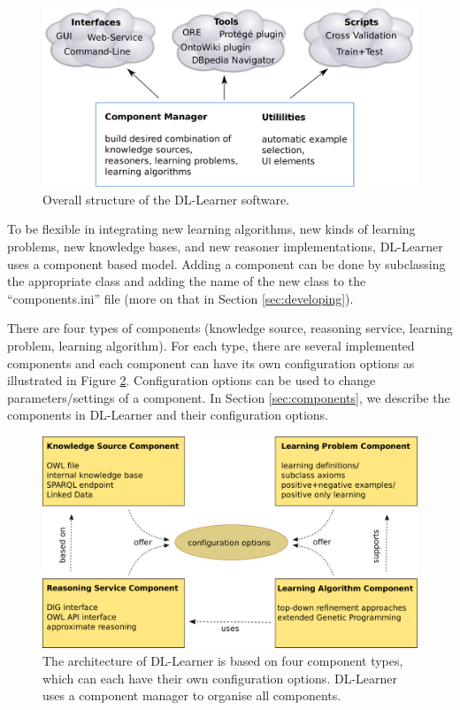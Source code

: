 \documentclass[a4paper,12pt]{scrartcl}
\begin{document}
\begin{figure}
 \includegraphics[width=\textwidth]{../../resources/structure_print}
 \caption{Overall structure of the DL-Learner software.}
 \label{fig:structure}
\end{figure}

To be flexible in integrating new learning algorithms, new kinds of learning problems, new knowledge bases, and new reasoner implementations, DL-Learner uses a component based model. Adding a component can be done by subclassing the appropriate class and adding the name of the new class to the “components.ini” file (more on that in Section \ref{sec:developing}).

There are four types of components (knowledge source, reasoning service, learning problem, learning algorithm). For each type, there are several implemented components and each component can have its own configuration options as illustrated in Figure \ref{fig:components}. Configuration options can be used to change parameters/settings of a component. In Section \ref{sec:components}, we describe the components in DL-Learner and their configuration options.

\begin{figure}
 \includegraphics[width=\textwidth]{../../resources/components_print}
 \caption{The architecture of DL-Learner is based on four component types, which can each have their own configuration options. DL-Learner uses a component manager to organise all components.}
 \label{fig:components}
\end{figure}
\end{document}
